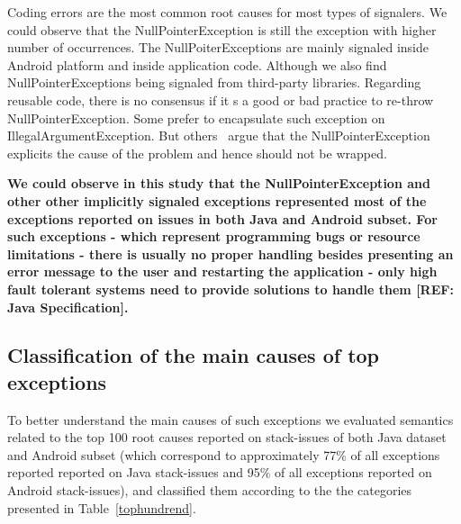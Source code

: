 \documentclass[conference]{IEEEtran}
\begin{document}
Coding errors are the most common root causes for most types of signalers. We
could observe that the NullPointerException is still the exception with higher
number of occurrences. The NullPoiterExceptions are mainly signaled inside
Android platform and inside application code. Although we also find
NullPointerExceptions being signaled from third-party libraries. Regarding
reusable code, there is no consensus if it s a good or bad practice to re-throw
NullPointerException. Some prefer to encapsulate such exception on
IllegalArgumentException. But others~\cite{joshuabloch} argue that the
NullPointerException  explicits the cause of the problem and hence should not be
wrapped.

\textbf{We could observe in this study that the NullPointerException and other
other implicitly signaled exceptions represented most of the exceptions reported
on issues in both Java and Android subset. For such exceptions - which represent
programming bugs or resource limitations - there is usually no proper handling
besides presenting an error message to the user and restarting the application -
only high fault tolerant systems need to provide solutions to handle them [REF:
Java Specification].}

\subsection{Classification of the main causes of top exceptions}

To better understand the main causes of such exceptions we evaluated semantics
related to the top 100 root causes reported on stack-issues of both Java dataset
and Android subset (which correspond to approximately 77\% of all exceptions
reported reported on Java stack-issues and 95\% of all exceptions reported on
Android stack-issues), and classified them according to the the categories
presented in Table~\ref{tophundrend}.
\end{document}
